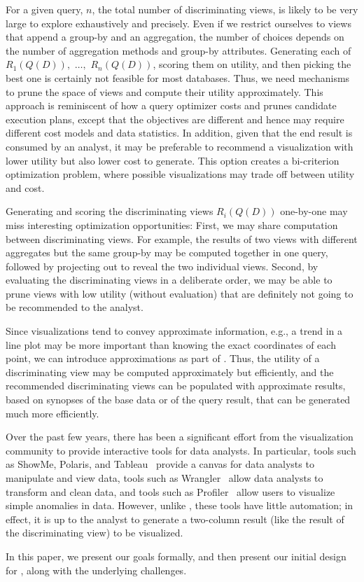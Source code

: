 \begin{denselist}

\item For a given query, $n$, the total number of discriminating views, is
likely to be very large to explore exhaustively and precisely. Even if we
restrict ourselves to views that append a group-by and an aggregation, the
number of choices depends on the number of aggregation methods and group-by
attributes. Generating each of $R_1(Q(D)),$  $\ldots,$ $R_n(Q(D))$, scoring them
on utility, and then picking the best one is certainly not feasible for most
databases. Thus, we need mechanisms to prune the space of views and compute
their utility approximately. This approach is reminiscent of how a query
optimizer costs and prunes candidate execution plans, except that the objectives
are different and hence may require different cost models and data statistics.
In addition, given that the end result is consumed by an analyst, it may be
preferable to recommend a visualization with lower utility but also lower cost
to generate. This option creates a bi-criterion optimization problem, where
possible visualizations may trade off between utility and cost.

\item Generating and scoring the discriminating views $R_i(Q(D))$ one-by-one may
miss interesting optimization opportunities: First, we may share computation
between discriminating views.  For example, the results of two views with
different aggregates but the same group-by may be computed together in one
query, followed by projecting out to reveal the two individual views.  Second,
by evaluating the discriminating views in a deliberate order, we may be able to
prune views with low utility (without evaluation) that are definitely not going
to be recommended to the analyst.

\item Since visualizations tend to convey approximate information, e.g., a trend
in a line plot may be more important than knowing the exact coordinates of each
point, we can introduce approximations as part of \SeeDB.  Thus, the utility of
a discriminating view may be computed approximately but efficiently, and the
recommended discriminating views can be populated with approximate results,
based on synopses of the base data or of the query result, that can be generated
much more efficiently.

\end{denselist}

\noindent Over the past few years, there has been a significant
effort from the visualization community to provide interactive tools
for data analysts. In particular, tools such as ShowMe, Polaris, and
Tableau~\cite{DBLP:journals/cacm/StolteTH08,
  DBLP:journals/tvcg/MackinlayHS07} provide a canvas for data analysts
to manipulate and view data, tools such as
Wrangler~\cite{DBLP:conf/chi/KandelPHH11} allow data analysts to
transform and clean data, and tools such as
Profiler~\cite{DBLP:conf/avi/KandelPPHH12} allow users to visualize
simple anomalies in data.  However, unlike \SeeDB, these tools have
little automation; in effect, it is up to the analyst to generate a
two-column result (like the result of the discriminating view)
to be visualized.

In this paper, we present our goals formally, and then present our initial design for \SeeDB, along with the underlying challenges.